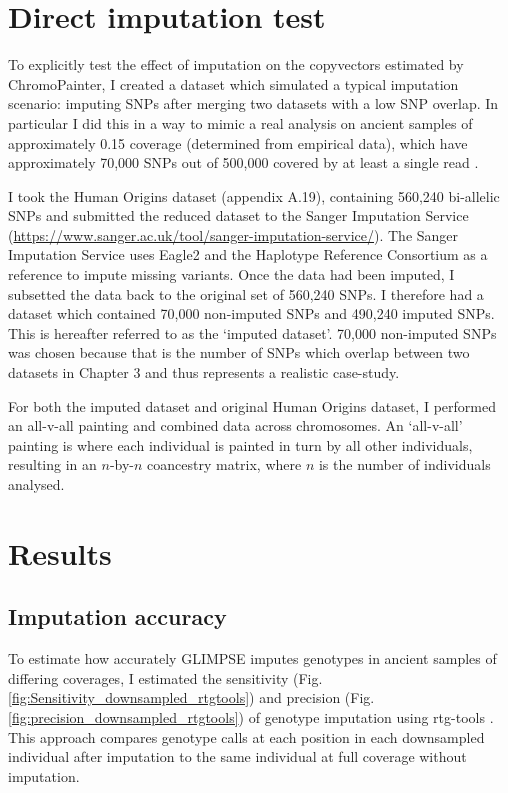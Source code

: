 \section{Direct imputation test}

To explicitly test the effect of imputation on the copyvectors estimated by ChromoPainter, I created a dataset which simulated a typical imputation scenario: imputing SNPs after merging two datasets with a low SNP overlap. In particular I did this in a way to mimic a real analysis on ancient samples of approximately 0.15 coverage (determined from empirical data), which have approximately 70,000 SNPs out of 500,000 covered by at least a single read . 

I took the Human Origins dataset (appendix A.19), containing 560,240 bi-allelic SNPs and submitted the reduced dataset to the Sanger Imputation Service (\url{https://www.sanger.ac.uk/tool/sanger-imputation-service/}). The Sanger Imputation Service uses Eagle2 \cite{loh2016reference} and the Haplotype Reference Consortium as a reference to impute missing variants. Once the data had been imputed, I subsetted the data back to the original set of 560,240 SNPs. I therefore had a dataset which contained 70,000 non-imputed SNPs and 490,240 imputed SNPs. This is hereafter referred to as the `imputed dataset'. 70,000 non-imputed SNPs was chosen because that is the number of SNPs which overlap between two datasets in Chapter 3 and thus represents a realistic case-study. 

For both the imputed dataset and original Human Origins dataset, I performed an all-v-all painting and combined data across chromosomes. An `all-v-all' painting is where each individual is painted in turn by all other individuals, resulting in an $n$-by-$n$ coancestry matrix, where $n$ is the number of individuals analysed.


\section{Results}

\subsection{Imputation accuracy}

To estimate how accurately GLIMPSE imputes genotypes in ancient samples of differing coverages, I estimated the sensitivity (Fig. \ref{fig:Sensitivity_downsampled_rtgtools}) and precision (Fig.  \ref{fig:precision_downsampled_rtgtools}) of genotype imputation using rtg-tools \cite{cleary2014joint}. This approach compares genotype calls at each position in each downsampled individual after imputation to the same individual at full coverage without imputation.

